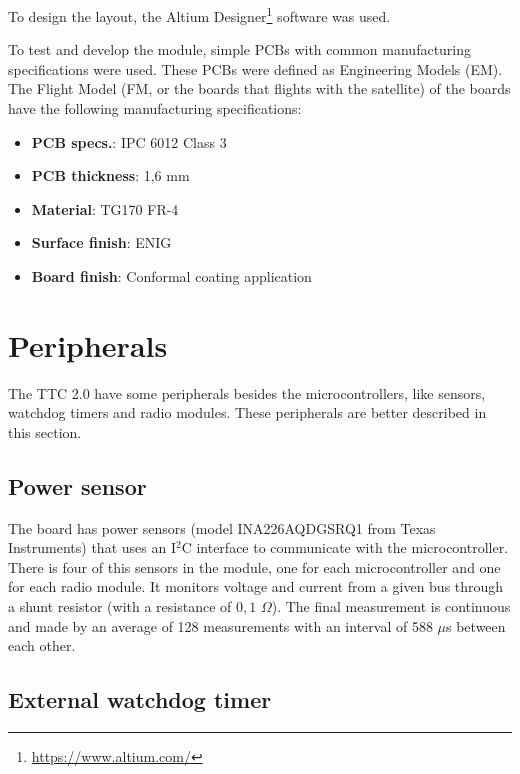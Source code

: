 To design the layout, the Altium Designer\footnote{\href{https://www.altium.com/}{https://www.altium.com/}} software was used.

To test and develop the module, simple PCBs with common manufacturing specifications were used. These PCBs were defined as Engineering Models (EM). The Flight Model (FM, or the boards that flights with the satellite) of the boards have the following manufacturing specifications:

\begin{itemize}
    \item \textbf{PCB specs.}: IPC 6012 Class 3
    \item \textbf{PCB thickness}: 1,6 mm
    \item \textbf{Material}: TG170 FR-4
    \item \textbf{Surface finish}: ENIG
    \item \textbf{Board finish}: Conformal coating application
\end{itemize}

\section{Peripherals}

The TTC 2.0 have some peripherals besides the microcontrollers, like sensors, watchdog timers and radio modules. These peripherals are better described in this section.

\subsection{Power sensor}

The board has power sensors (model INA226AQDGSRQ1 from Texas Instruments) that uses an I$^{2}$C interface to communicate with the microcontroller. There is four of this sensors in the module, one for each microcontroller and one for each radio module. It monitors voltage and current from a given bus through a shunt resistor (with a resistance of $0,1$ $\Omega$). The final measurement is continuous and made by an average of 128 measurements with an interval of 588 $\mu$s between each other.

\subsection{External watchdog timer}

